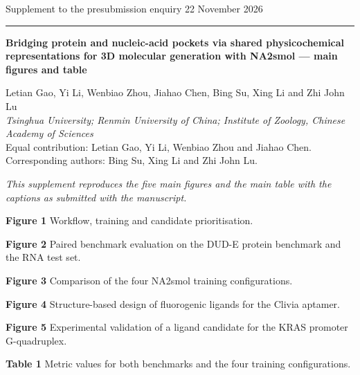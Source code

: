 \documentclass[11pt]{article}
\begin{document}
{\footnotesize Supplement to the presubmission enquiry \hfill 22 November 2026}\\[-0.25em]
\rule{\textwidth}{0.4pt}
\vspace{0.5em}

{\bfseries\large Bridging protein and nucleic-acid pockets via shared physicochemical
representations for 3D molecular generation with NA2smol --- main figures and table}

\vspace{0.3em}
{\footnotesize Letian Gao, Yi Li, Wenbiao Zhou, Jiahao Chen, Bing Su, Xing Li and Zhi John Lu}\\[-0.15em]
{\footnotesize \emph{Tsinghua University; Renmin University of China; Institute of Zoology, Chinese Academy of Sciences}}\\[-0.15em]
{\footnotesize Equal contribution: Letian Gao, Yi Li, Wenbiao Zhou and Jiahao Chen. Corresponding authors: Bing Su, Xing Li and Zhi John Lu.}

\vspace{0.8em}
{\footnotesize\emph{This supplement reproduces the five main figures and the main table with the
captions as submitted with the manuscript.}}\par
\vspace{0.4em}
{\footnotesize
\textbf{Figure 1} Workflow, training and candidate prioritisation.\par
\textbf{Figure 2} Paired benchmark evaluation on the DUD-E protein benchmark and the RNA test set.\par
\textbf{Figure 3} Comparison of the four NA2smol training configurations.\par
\textbf{Figure 4} Structure-based design of fluorogenic ligands for the Clivia aptamer.\par
\textbf{Figure 5} Experimental validation of a ligand candidate for the KRAS promoter G-quadruplex.\par
\textbf{Table 1} Metric values for both benchmarks and the four training configurations.\par
}

\clearpage
\end{document}
